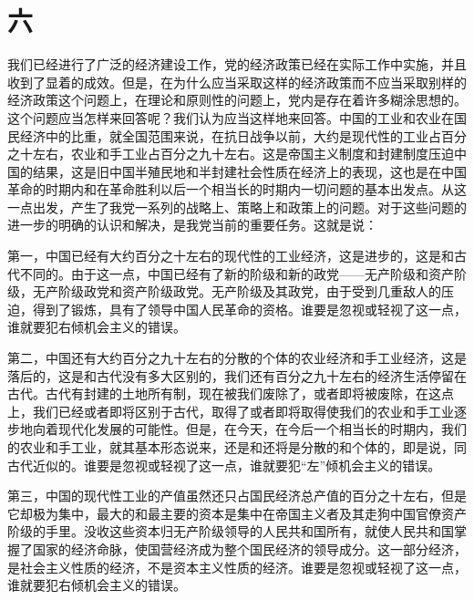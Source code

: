 \section*{六}

我们已经进行了广泛的经济建设工作，党的经济政策已经在实际工作中实施，并且收到了显着的成效。但是，在为什么应当采取这样的经济政策而不应当采取别样的经济政策这个问题上，在理论和原则性的问题上，党内是存在着许多糊涂思想的。这个问题应当怎样来回答呢？我们认为应当这样地来回答。中国的工业和农业在国民经济中的比重，就全国范围来说，在抗日战争以前，大约是现代性的工业占百分之十左右，农业和手工业占百分之九十左右。这是帝国主义制度和封建制度压迫中国的结果，这是旧中国半殖民地和半封建社会性质在经济上的表现，这也是在中国革命的时期内和在革命胜利以后一个相当长的时期内一切问题的基本出发点。从这一点出发，产生了我党一系列的战略上、策略上和政策上的问题。对于这些问题的进一步的明确的认识和解决，是我党当前的重要任务。这就是说：

第一，中国已经有大约百分之十左右的现代性的工业经济，这是进步的，这是和古代不同的。由于这一点，中国已经有了新的阶级和新的政党——无产阶级和资产阶级，无产阶级政党和资产阶级政党。无产阶级及其政党，由于受到几重敌人的压迫，得到了锻炼，具有了领导中国人民革命的资格。谁要是忽视或轻视了这一点，谁就要犯右倾机会主义的错误。

第二，中国还有大约百分之九十左右的分散的个体的农业经济和手工业经济，这是落后的，这是和古代没有多大区别的，我们还有百分之九十左右的经济生活停留在古代。古代有封建的土地所有制，现在被我们废除了，或者即将被废除，在这点上，我们已经或者即将区别于古代，取得了或者即将取得使我们的农业和手工业逐步地向着现代化发展的可能性。但是，在今天，在今后一个相当长的时期内，我们的农业和手工业，就其基本形态说来，还是和还将是分散的和个体的，即是说，同古代近似的。谁要是忽视或轻视了这一点，谁就要犯“左”倾机会主义的错误。

第三，中国的现代性工业的产值虽然还只占国民经济总产值的百分之十左右，但是它却极为集中，最大的和最主要的资本是集中在帝国主义者及其走狗中国官僚资产阶级的手里。没收这些资本归无产阶级领导的人民共和国所有，就使人民共和国掌握了国家的经济命脉，使国营经济成为整个国民经济的领导成分。这一部分经济，是社会主义性质的经济，不是资本主义性质的经济。谁要是忽视或轻视了这一点，谁就要犯右倾机会主义的错误。

